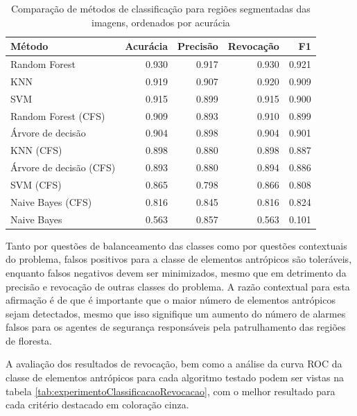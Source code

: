 \begin{table}[h]
\centering
	\begin{tabulary}{\linewidth}{|L|R|R|R|R|}
		\hline
		\textbf{Método} & \textbf{Acurácia} & \textbf{Precisão} & \textbf{Revocação} & \textbf{F1} \\ \hline
		Random Forest           & 0.930 & 0.917 & 0.930 & 0.921 \\ \hline
		KNN                     & 0.919 & 0.907 & 0.920 & 0.909 \\ \hline
		SVM                     & 0.915 & 0.899 & 0.915 & 0.900 \\ \hline
		Random Forest (CFS)     & 0.909 & 0.893 & 0.910 & 0.899 \\ \hline
		Árvore de decisão       & 0.904 & 0.898 & 0.904 & 0.901 \\ \hline
		KNN (CFS)               & 0.898 & 0.880 & 0.898 & 0.887 \\ \hline
		Árvore de decisão (CFS) & 0.893 & 0.880 & 0.894 & 0.886 \\ \hline
		SVM (CFS)               & 0.865 & 0.798 & 0.866 & 0.808 \\ \hline
		Naive Bayes (CFS)       & 0.816 & 0.845 & 0.816 & 0.824 \\ \hline
		Naive Bayes             & 0.563 & 0.857 & 0.563 & 0.101 \\ \hline
	\end{tabulary}
\caption{Comparação de métodos de classificação para regiões segmentadas das imagens, ordenados por acurácia}
\label{tab:experimentoClassificacao1}
\end{table}

Tanto por questões de balanceamento das classes como por questões contextuais do problema, falsos positivos para a classe de elementos antrópicos são toleráveis, enquanto falsos negativos devem ser minimizados, mesmo que em detrimento da precisão e revocação de outras classes do problema. A razão contextual para esta afirmação é de que é importante que o maior número de elementos antrópicos sejam detectados, mesmo que isso signifique um aumento do número de alarmes falsos para os agentes de segurança responsáveis pela patrulhamento das regiões de floresta.

A avaliação dos resultados de revocação, bem como a análise da curva ROC da classe de elementos antrópicos para cada algoritmo testado podem ser vistas na tabela \ref{tab:experimentoClassificacaoRevocacao}, com o melhor resultado para cada critério destacado em coloração cinza.

